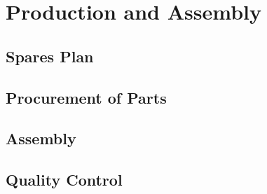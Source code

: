 \section{Production and Assembly}
\label{sec:fdsp-tpcelec-production}

\subsection{Spares Plan}
\label{sec:fdsp-tpcelec-production-spares}

\subsection{Procurement of Parts}
\label{sec:fdsp-tpcelec-production-procurement}

\subsection{Assembly}
\label{sec:fdsp-tpcelec-production-assembly}

\subsection{Quality Control}
\label{sec:fdsp-tpcelec-production-qc}
